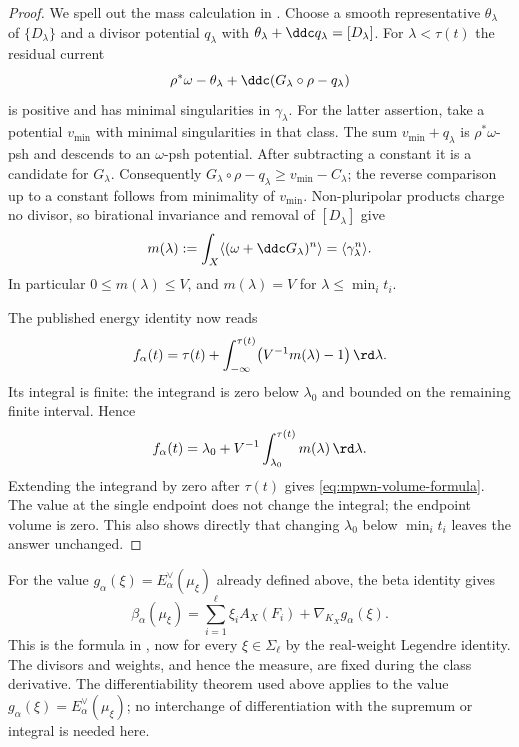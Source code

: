\begin{proof}
We spell out the mass calculation in
\cite[proof of Theorem~10.1.2]{MPWN25}.
Choose a smooth representative $\theta_\lambda$ of $\{D_\lambda\}$
and a divisor potential $q_\lambda$ with
$\theta_\lambda+\ddc q_\lambda=[D_\lambda]$.
For $\lambda<\tau(t)$ the residual current
\[
 \rho^*\omega-\theta_\lambda
       +\ddc(G_\lambda\circ\rho-q_\lambda)
\]
is positive and has minimal singularities in $\gamma_\lambda$.
For the latter assertion, take a potential $v_{\min}$ with
minimal singularities in that class.
The sum $v_{\min}+q_\lambda$ is $\rho^*\omega$-psh and descends
to an $\omega$-psh potential.  After subtracting a constant it is
a candidate for $G_\lambda$.  Consequently
$G_\lambda\circ\rho-q_\lambda\geq v_{\min}-C_\lambda$;
the reverse comparison up to a constant follows from minimality
of $v_{\min}$.  Non-pluripolar products charge no divisor, so
birational invariance and removal of $[D_\lambda]$ give
\[
 m(\lambda):=\int_X\langle(\omega+\ddc G_\lambda)^n\rangle
                         =\langle\gamma_\lambda^n\rangle.
\]
In particular $0\leq m(\lambda)\leq V$, and $m(\lambda)=V$
for $\lambda\leq\min_i t_i$.

The published energy identity
\cite[equation~(5), Theorem~2.6(iii)]{DXZ23} now reads
\[
 f_\alpha(t)=\tau(t)+
     \int_{-\infty}^{\tau(t)}
                         \bigl(V^{-1}m(\lambda)-1\bigr)\,\rd\lambda.
\]
Its integral is finite: the integrand is zero below $\lambda_0$
and bounded on the remaining finite interval.  Hence
\[
 f_\alpha(t)=\lambda_0+
                 V^{-1}\int_{\lambda_0}^{\tau(t)}m(\lambda)\,\rd\lambda.
\]
Extending the integrand by zero after $\tau(t)$ gives
\eqref{eq:mpwn-volume-formula}.  The value at the single endpoint
does not change the integral; the endpoint volume is zero.
This also shows directly that changing $\lambda_0$ below
$\min_i t_i$ leaves the answer unchanged.
\end{proof}

For the value $g_\alpha(\xi)=E_\alpha^\vee(\mu_\xi)$ already defined above, the beta identity gives
\[
 \beta_\alpha(\mu_\xi)
 =\sum_{i=1}^{\ell}\xi_iA_X(F_i)
      +\nabla_{K_X}g_\alpha(\xi).
\tag{62.26}\label{eq:mpwn-beta-explicit}
\]
This is the formula in \cite[Corollary~10.1.4, p.~40]{MPWN25}, now for every $\xi\in\Sigma_\ell$ by the real-weight Legendre identity.
The divisors and weights, and hence the measure, are fixed during
the class derivative.  The differentiability theorem used above
applies to the value $g_\alpha(\xi)=E_\alpha^\vee(\mu_\xi)$;
no interchange of differentiation with the supremum or integral
is needed here.

